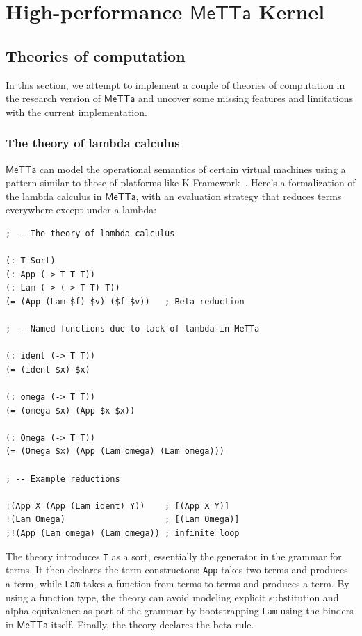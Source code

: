 \documentclass{article}
\begin{document}
\section{High-performance $\mathsf{MeTTa}$ Kernel}

\subsection{Theories of computation}
\label{Theories of computation}

In this section, we attempt to implement a couple of theories of
computation in the research version of $\mathsf{MeTTa}$ and uncover
some missing features and limitations with the current implementation.

\subsubsection{The theory of lambda calculus}
$\mathsf{MeTTa}$ can model the operational semantics of certain
virtual machines using a pattern similar to those of platforms like K
Framework~\cite{kframework}.  Here's a formalization of the lambda
calculus in $\mathsf{MeTTa}$, with an evaluation strategy that reduces
terms everywhere except under a lambda:

\begin{verbatim}
; -- The theory of lambda calculus

(: T Sort)
(: App (-> T T T))
(: Lam (-> (-> T T) T))
(= (App (Lam $f) $v) ($f $v))   ; Beta reduction

; -- Named functions due to lack of lambda in MeTTa

(: ident (-> T T))
(= (ident $x) $x)

(: omega (-> T T))
(= (omega $x) (App $x $x))

(: Omega (-> T T))
(= (Omega $x) (App (Lam omega) (Lam omega)))

; -- Example reductions

!(App X (App (Lam ident) Y))    ; [(App X Y)]
!(Lam Omega)                    ; [(Lam Omega)]
;!(App (Lam omega) (Lam omega)) ; infinite loop
\end{verbatim}

The theory introduces \verb+T+ as a sort, essentially the generator in
the grammar for terms.  It then declares the term constructors:
\verb+App+ takes two terms and produces a term, while \verb+Lam+ takes
a function from terms to terms and produces a term.  By using a
function type, the theory can avoid modeling explicit substitution and
alpha equivalence as part of the grammar by bootstrapping \verb+Lam+
using the binders in $\mathsf{MeTTa}$ itself.  Finally, the theory
declares the beta rule.
\end{document}
